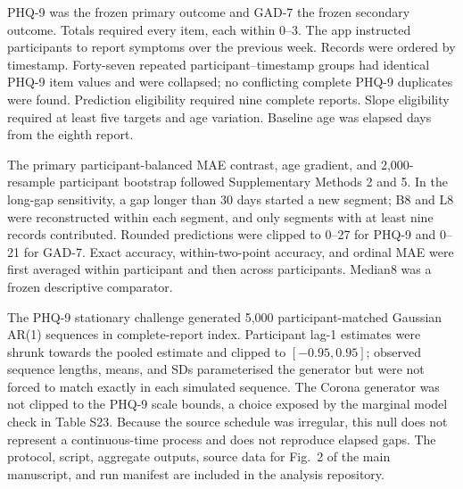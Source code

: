 \documentclass[pdflatex,sn-vancouver-num]{sn-jnl}
\begin{document}
PHQ-9 was the frozen primary outcome and GAD-7 the frozen secondary outcome. Totals required every item, each within 0--3. The app instructed participants to report symptoms over the previous week. Records were ordered by timestamp. Forty-seven repeated participant--timestamp groups had identical PHQ-9 item values and were collapsed; no conflicting complete PHQ-9 duplicates were found. Prediction eligibility required nine complete reports. Slope eligibility required at least five targets and age variation. Baseline age was elapsed days from the eighth report.

The primary participant-balanced MAE contrast, age gradient, and 2,000-resample participant bootstrap followed Supplementary Methods 2 and 5. In the long-gap sensitivity, a gap longer than 30 days started a new segment; B8 and L8 were reconstructed within each segment, and only segments with at least nine records contributed. Rounded predictions were clipped to 0--27 for PHQ-9 and 0--21 for GAD-7. Exact accuracy, within-two-point accuracy, and ordinal MAE were first averaged within participant and then across participants. Median8 was a frozen descriptive comparator.

The PHQ-9 stationary challenge generated 5,000 participant-matched Gaussian AR(1) sequences in complete-report index. Participant lag-1 estimates were shrunk towards the pooled estimate and clipped to $[-0.95,0.95]$; observed sequence lengths, means, and SDs parameterised the generator but were not forced to match exactly in each simulated sequence. The Corona generator was not clipped to the PHQ-9 scale bounds, a choice exposed by the marginal model check in Table S23. Because the source schedule was irregular, this null does not represent a continuous-time process and does not reproduce elapsed gaps. The protocol, script, aggregate outputs, source data for Fig.~2 of the main manuscript, and run manifest are included in the analysis repository.
\end{document}
